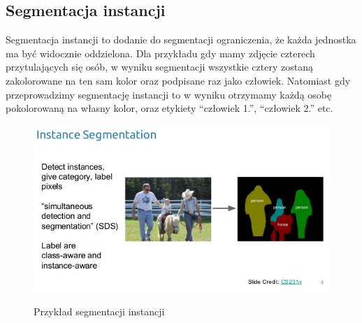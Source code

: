 \documentclass{article}
\begin{document}
\subsection{Segmentacja instancji}
Segmentacja instancji to dodanie do segmentacji ograniczenia, że każda jednostka ma być widocznie oddzielona.
Dla przykładu gdy mamy zdjęcie czterech przytulających się osób, w wyniku segmentacji wszystkie cztery zostaną zakolorowane na ten sam kolor oraz podpisane raz jako człowiek.
Natomiast gdy przeprowadzimy segmentację instancji to w wyniku otrzymamy każdą osobę pokolorowaną na własny kolor, oraz etykiety ``człowiek 1.'', ``człowiek 2.'' etc.
\begin{figure}[H]
    \centering
    \includegraphics[width=\linewidth]{images/segmentacja_instancji.jpeg}
    \caption{Przykład segmentacji instancji}
    \cite{unet}
    \label{fig:segmentacja_instancji}
\end{figure}
\newpage
\end{document}
